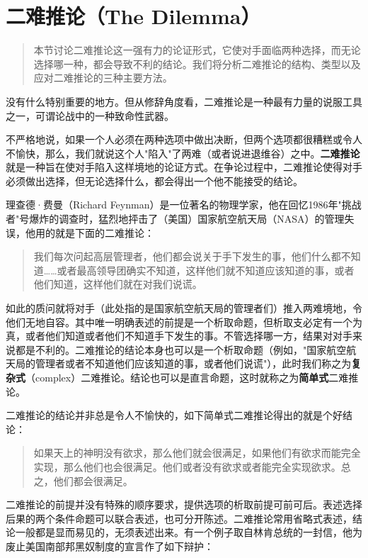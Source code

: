 \section{二难推论（The Dilemma）}

\begin{quotation}
本节讨论二难推论这一强有力的论证形式，它使对手面临两种选择，而无论选择哪一种，都会导致不利的结论。我们将分析二难推论的结构、类型以及应对二难推论的三种主要方法。
\end{quotation}

没有什么特别重要的地方。但从修辞角度看，二难推论是一种最有力量的说服工具之一，可谓论战中的一种致命性武器。

不严格地说，如果一个人必须在两种选项中做出决断，但两个选项都很糟糕或令人不愉快，那么，我们就说这个人"陷入"了两难（或者说进退维谷）之中。\textbf{二难推论}就是一种旨在使对手陷入这样境地的论证方式。在争论过程中，二难推论使得对手必须做出选择，但无论选择什么，都会得出一个他不能接受的结论。

理查德·费曼（Richard Feynman）是一位著名的物理学家，他在回忆1986年"挑战者"号爆炸的调查时，猛烈地抨击了（美国）国家航空航天局（NASA）的管理失误，他用的就是下面的二难推论：

\begin{quote}
我们每次问起高层管理者，他们都会说关于手下发生的事，他们什么都不知道……或者最高领导团确实不知道，这样他们就不知道应该知道的事，或者他们知道，这样他们就在对我们说谎。\cite{feynman1988}
\end{quote}

如此的质问就将对手（此处指的是国家航空航天局的管理者们）推入两难境地，令他们无地自容。其中唯一明确表述的前提是一个析取命题，但析取支必定有一个为真，或者他们知道或者他们不知道手下发生的事。不管选择哪一方，结果对对手来说都是不利的。二难推论的结论本身也可以是一个析取命题（例如，"国家航空航天局的管理者或者不知道他们应该知道的事，或者他们说谎"），此时我们称之为\textbf{复杂式}（complex）二难推论。结论也可以是直言命题，这时就称之为\textbf{简单式}二难推论。

二难推论的结论并非总是令人不愉快的，如下简单式二难推论得出的就是个好结论：

\begin{quote}
如果天上的神明没有欲求，那么他们就会很满足，如果他们有欲求而能完全实现，那么他们也会很满足。他们或者没有欲求或者能完全实现欲求。总之，他们都会很满足。
\end{quote}

二难推论的前提并没有特殊的顺序要求，提供选项的析取前提可前可后。表述选择后果的两个条件命题可以联合表述，也可分开陈述。二难推论常用省略式表述，结论一般都是显而易见的，无须表述出来。有一个例子取自林肯总统的一封信，他为废止美国南部邦黑奴制度的宣言作了如下辩护：

